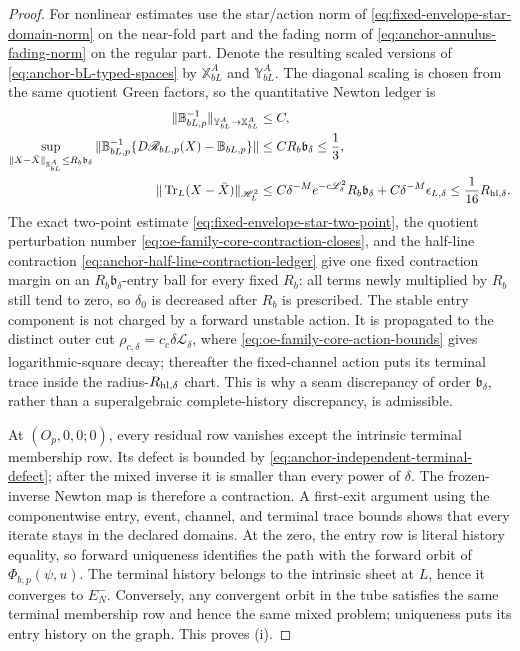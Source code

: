 \begin{proof}
For nonlinear estimates use the star/action norm of
\cref{eq:fixed-envelope-star-domain-norm} on the near-fold part and the
fading norm of \cref{eq:anchor-annulus-fading-norm} on the regular part.
Denote the resulting scaled versions of
\cref{eq:anchor-bL-typed-spaces} by \(\mathbb X_{bL}^A\) and
\(\mathbb Y_{bL}^A\).  The diagonal scaling is chosen from the same
quotient Green factors, so the quantitative Newton ledger is
\begin{align}
 \|\mathbb B_{bL,p}^{-1}\|_{\mathbb Y_{bL}^A\to\mathbb X_{bL}^A}
 &\le C,\notag\\
 \sup_{\|X-\bar X\|_{\mathbb X_{bL}^A}\le R_b\mathfrak b_\delta}
 \|\mathbb B_{bL,p}^{-1}
       \{D\mathscr R_{bL,p}(X)-\mathbb B_{bL,p}\}\|
 &\le CR_b\mathfrak b_\delta\le\frac13,            \label{eq:anchor-b-balanced-Newton-ledger}\\
 \|\operatorname{Tr}_L(X-\bar X)\|_{\mathscr H_L^2}
 &\le C\delta^{-M}e^{-c\mathscr L_\delta^2}
          R_b\mathfrak b_\delta+C\delta^{-M}\epsilon_{L,\delta}
 \le\frac1{16}R_{\rm hl,\delta}.                   \label{eq:anchor-b-terminal-localization}
\end{align}
The exact two-point estimate
\cref{eq:fixed-envelope-star-two-point}, the quotient perturbation number
\cref{eq:oe-family-core-contraction-closes}, and the half-line contraction
\cref{eq:anchor-half-line-contraction-ledger} give one fixed contraction
margin on an \(R_b\mathfrak b_\delta\)-entry ball for every fixed
\(R_b\): all terms newly multiplied by \(R_b\) still tend to zero, so
\(\delta_0\) is decreased after \(R_b\) is prescribed.  The stable entry
component is not charged by a forward unstable action.  It is propagated
to the distinct outer cut \(\rho_{c,\delta}=c_c\delta\mathscr L_\delta\),
where
\cref{eq:oe-family-core-action-bounds} gives logarithmic-square decay;
thereafter the fixed-channel action puts its terminal trace inside the
radius-\(R_{\rm hl,\delta}\) chart.  This is why a seam discrepancy of
order \(\mathfrak b_\delta\), rather than a superalgebraic complete-history
discrepancy, is admissible.

At \((O_p,0,0;0)\), every residual row vanishes except the intrinsic
terminal membership row.  Its defect is bounded by
\cref{eq:anchor-independent-terminal-defect}; after the mixed inverse it is
smaller than every power of \(\delta\).  The frozen-inverse Newton map is
therefore a contraction.  A first-exit argument using the componentwise
entry, event, channel, and terminal trace bounds shows that every iterate
stays in the declared domains.  At the zero, the entry row is literal
history equality, so forward uniqueness identifies the path with the
forward orbit of \(\Phi_{b,p}(\psi,u)\).  The terminal history belongs to
the intrinsic sheet at \(L\), hence it converges to \(E_N^-\).  Conversely,
any convergent orbit in the tube satisfies the same terminal membership
row and hence the same mixed problem; uniqueness puts its entry history on
the graph.  This proves (i).


\end{proof}
